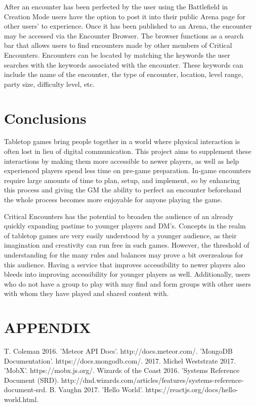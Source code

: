 \documentclass[letterpaper, 10 pt, conference]{ieeeconf}
\begin{document}
After an encounter has been perfected by the user using the Battlefield in
Creation Mode users have the option to post it into their public Arena page for
other users’ to experience. Once it has been published to an Arena, the encounter
may be accessed via the Encounter Browser. The browser functions as a search bar
that allows users to find encounters made by other members of Critical Encounters.
Encounters can be located by matching the keywords the user searches with the
keywords associated with the encounter. These keywords can include the name
of the encounter, the type of encounter, location, level range, party size, difficulty
level, etc.

\section{Conclusions}

Tabletop games bring people together in a world where physical interaction is
often lost in lieu of digital communication. This project aims to supplement these
interactions by making them more accessible to newer players, as well as help
experienced players spend less time on pre-game preparation. In-game encounters
require large amounts of time to plan, setup, and implement, so by enhancing
this process and giving the GM the ability to perfect an encounter beforehand the
whole process becomes more enjoyable for anyone playing the game.
\par Critical Encounters has the potential to broaden the audience of an already quickly
expanding pastime to younger players and DM’s. Concepts in the realm of tabletop
games are very easily understood by a younger audience, as their imagination and
creativity can run free in such games. However, the threshold of understanding
for the many rules and balances may prove a bit overzealous for this audience.
Having a service that improves accessibility to newer players  also bleeds
into improving accessibility for younger players as well. Additionally, users who
do not have a group to play with may find and form groups with other users with
whom they have played and shared content with.

\section*{APPENDIX}

\listoffigures

\begin{thebibliography}{99}

 T. Coleman 2016. 'Meteor API Docs'. http://docs.meteor.com/.
 'MongoDB Documentation'. https://docs.mongodb.com/. 2017.
 Michel Weststrate 2017. 'MobX'. https://mobx.js.org/.
 Wizards of the Coast 2016. 'Systems Reference Document (SRD). http://dnd.wizards.com/articles/features/systems-reference-document-srd.
 B. Vaughn 2017. 'Hello World'. https://reactjs.org/docs/hello-world.html.

\end{thebibliography}
\end{document}
